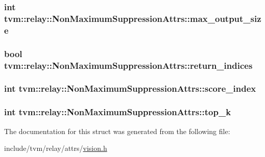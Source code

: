 \subsubsection[{\texorpdfstring{max\+\_\+output\+\_\+size}{max_output_size}}]{\setlength{\rightskip}{0pt plus 5cm}int tvm\+::relay\+::\+Non\+Maximum\+Suppression\+Attrs\+::max\+\_\+output\+\_\+size}\hypertarget{structtvm_1_1relay_1_1NonMaximumSuppressionAttrs_a71dd0bfee474b0d269aceaba8b9dcc9e}{}\label{structtvm_1_1relay_1_1NonMaximumSuppressionAttrs_a71dd0bfee474b0d269aceaba8b9dcc9e}
\subsubsection[{\texorpdfstring{return\+\_\+indices}{return_indices}}]{\setlength{\rightskip}{0pt plus 5cm}bool tvm\+::relay\+::\+Non\+Maximum\+Suppression\+Attrs\+::return\+\_\+indices}\hypertarget{structtvm_1_1relay_1_1NonMaximumSuppressionAttrs_a595087194062b5cce8a36479fa82716b}{}\label{structtvm_1_1relay_1_1NonMaximumSuppressionAttrs_a595087194062b5cce8a36479fa82716b}
\subsubsection[{\texorpdfstring{score\+\_\+index}{score_index}}]{\setlength{\rightskip}{0pt plus 5cm}int tvm\+::relay\+::\+Non\+Maximum\+Suppression\+Attrs\+::score\+\_\+index}\hypertarget{structtvm_1_1relay_1_1NonMaximumSuppressionAttrs_aef590e963d5af653e09e6327808c4723}{}\label{structtvm_1_1relay_1_1NonMaximumSuppressionAttrs_aef590e963d5af653e09e6327808c4723}
\subsubsection[{\texorpdfstring{top\+\_\+k}{top_k}}]{\setlength{\rightskip}{0pt plus 5cm}int tvm\+::relay\+::\+Non\+Maximum\+Suppression\+Attrs\+::top\+\_\+k}\hypertarget{structtvm_1_1relay_1_1NonMaximumSuppressionAttrs_ad9e2e281399a290410757e948784b93a}{}\label{structtvm_1_1relay_1_1NonMaximumSuppressionAttrs_ad9e2e281399a290410757e948784b93a}


The documentation for this struct was generated from the following file\+:\begin{DoxyCompactItemize}
\item 
include/tvm/relay/attrs/\hyperlink{vision_8h}{vision.\+h}\end{DoxyCompactItemize}
